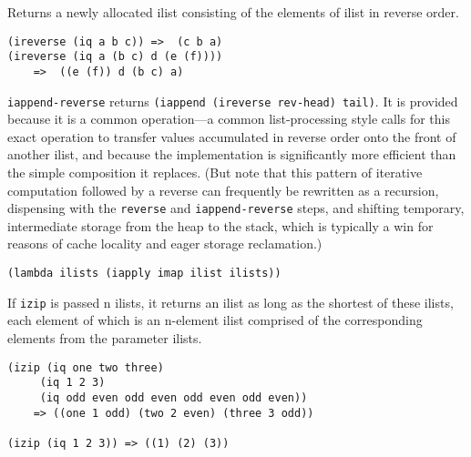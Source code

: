\begin{entry}{%
  }

  Returns a
  newly allocated ilist consisting of the elements of ilist in reverse
  order.

\begin{verbatim}
(ireverse (iq a b c)) =>  (c b a)
(ireverse (iq a (b c) d (e (f))))
    =>  ((e (f)) d (b c) a)
\end{verbatim}
\end{entry}

\begin{entry}{%
  }

  \texttt{iappend-reverse} returns \texttt{(iappend\ (ireverse\
    rev-head)\ tail)}. It is provided because it is a common
  operation---a common list-processing style calls for this exact
  operation to 
  transfer values accumulated in reverse order onto the front of
  another ilist, and because the implementation is significantly more
  efficient than the simple composition it replaces.  (But note that
  this pattern of iterative computation followed by a reverse can
  frequently be rewritten as a recursion, dispensing with the
  \texttt{reverse} and \texttt{iappend-reverse} steps, and shifting
  temporary, intermediate storage from the heap to the stack, which is
  typically a win for reasons of cache locality and eager storage
  reclamation.)
\end{entry}

\begin{entry}{%
  }

\begin{verbatim}
(lambda ilists (iapply imap ilist ilists))
\end{verbatim}

  If \texttt{izip} is passed n ilists, it returns an ilist as long as
  the shortest of these ilists, each element of which is an n-element
  ilist comprised of the corresponding elements from the parameter
  ilists.

\begin{verbatim}
(izip (iq one two three) 
     (iq 1 2 3)
     (iq odd even odd even odd even odd even))
    => ((one 1 odd) (two 2 even) (three 3 odd))

(izip (iq 1 2 3)) => ((1) (2) (3))
\end{verbatim}
\end{entry}


